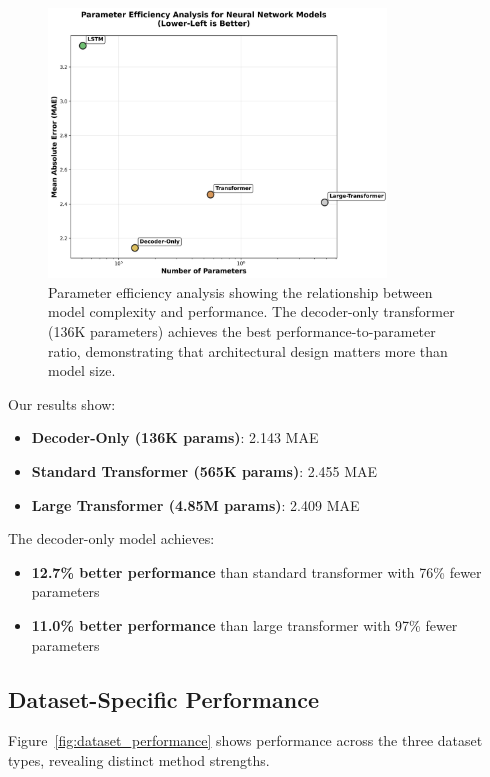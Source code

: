 \documentclass[11pt]{article}
\begin{document}
\begin{figure}[h]
\centering
\includegraphics[width=0.8\textwidth]{../results/figure2_parameter_efficiency.png}
\caption{Parameter efficiency analysis showing the relationship between model complexity and performance. The decoder-only transformer (136K parameters) achieves the best performance-to-parameter ratio, demonstrating that architectural design matters more than model size.}
\label{fig:param_efficiency}
\end{figure}

Our results show:
\begin{itemize}
\item \textbf{Decoder-Only (136K params)}: 2.143 MAE
\item \textbf{Standard Transformer (565K params)}: 2.455 MAE  
\item \textbf{Large Transformer (4.85M params)}: 2.409 MAE
\end{itemize}

The decoder-only model achieves:
\begin{itemize}
\item \textbf{12.7\% better performance} than standard transformer with 76\% fewer parameters
\item \textbf{11.0\% better performance} than large transformer with 97\% fewer parameters
\end{itemize}

\subsection{Dataset-Specific Performance}

Figure~\ref{fig:dataset_performance} shows performance across the three dataset types, revealing distinct method strengths.
\end{document}
